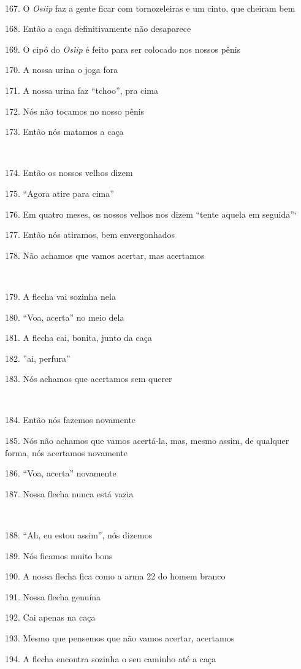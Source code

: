 ~

167. O \emph{Osiip} faz a gente ficar com tornozeleiras e um cinto, que
cheiram bem

168. Então a caça definitivamente não desaparece

169. O cipó do \emph{Osiip} é feito para ser colocado nos nossos pênis

170. A nossa urina o joga fora

171. A nossa urina faz ``tchoo'', pra cima

172. Nós não tocamos no nosso pênis

173. Então nós matamos a caça

~

174. Então os nossos velhos dizem

175. ``Agora atire para cima''

176. Em quatro meses, os nossos velhos nos dizem ``tente aquela em
seguida''`

177. Então nós atiramos, bem envergonhados

178. Não achamos que vamos acertar, mas acertamos

~

179. A flecha vai sozinha nela

180. ``Voa, acerta'' no meio dela

181. A flecha cai, bonita, junto da caça

182. ''ai, perfura''

183. Nós achamos que acertamos sem querer

~

184. Então nós fazemos novamente

185. Nós não achamos que vamos acertá-la, mas, mesmo assim, de qualquer
forma, nós acertamos novamente

186. ``Voa, acerta'' novamente

187. Nossa flecha nunca está vazia

~

188. ``Ah, eu estou assim'', nós dizemos

189. Nós ficamos muito bons

190. A nossa flecha fica como a arma 22 do homem branco

191. Nossa flecha genuína

192. Cai apenas na caça

193. Mesmo que pensemos que não vamos acertar, acertamos

194. A flecha encontra sozinha o seu caminho até a caça

